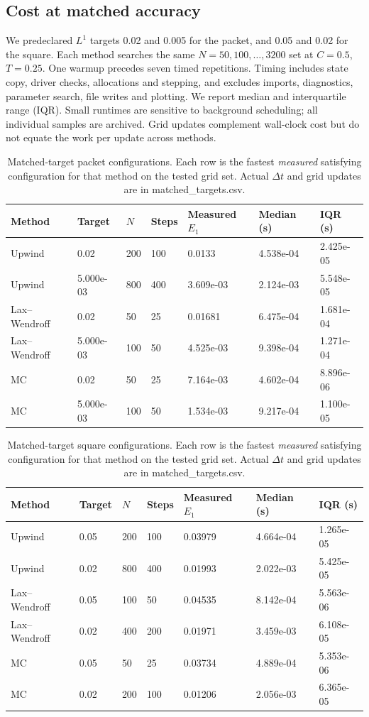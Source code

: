\subsection{Cost at matched accuracy}
We predeclared $L^1$ targets 0.02 and 0.005 for the packet, and 0.05 and 0.02 for the square. Each method searches the same $N=50,100,\ldots,3200$ set at $C=0.5$, $T=0.25$. One warmup precedes seven timed repetitions. Timing includes state copy, driver checks, allocations and stepping, and excludes imports, diagnostics, parameter search, file writes and plotting. We report median and interquartile range (IQR). Small runtimes are sensitive to background scheduling; all individual samples are archived. Grid updates complement wall-clock cost but do not equate the work per update across methods.
\begin{table}[htbp]\centering\small
\caption{Matched-target packet configurations. Each row is the fastest \emph{measured} satisfying configuration for that method on the tested grid set. Actual $\Delta t$ and grid updates are in matched\_targets.csv.}\label{tab:costpacket}
\begin{tabular}{lllllll}
\toprule
Method & Target & $N$ & Steps & Measured $E_1$ & Median (s) & IQR (s)\\\midrule
Upwind & 0.02 & 200 & 100 & 0.0133 & 4.538e-04 & 2.425e-05\\
Upwind & 5.000e-03 & 800 & 400 & 3.609e-03 & 2.124e-03 & 5.548e-05\\
Lax--Wendroff & 0.02 & 50 & 25 & 0.01681 & 6.475e-04 & 1.681e-04\\
Lax--Wendroff & 5.000e-03 & 100 & 50 & 4.525e-03 & 9.398e-04 & 1.271e-04\\
MC & 0.02 & 50 & 25 & 7.164e-03 & 4.602e-04 & 8.896e-06\\
MC & 5.000e-03 & 100 & 50 & 1.534e-03 & 9.217e-04 & 1.100e-05\\
\bottomrule\end{tabular}\end{table}
\begin{table}[htbp]\centering\small
\caption{Matched-target square configurations. Each row is the fastest \emph{measured} satisfying configuration for that method on the tested grid set. Actual $\Delta t$ and grid updates are in matched\_targets.csv.}\label{tab:costsquare}
\begin{tabular}{lllllll}
\toprule
Method & Target & $N$ & Steps & Measured $E_1$ & Median (s) & IQR (s)\\\midrule
Upwind & 0.05 & 200 & 100 & 0.03979 & 4.664e-04 & 1.265e-05\\
Upwind & 0.02 & 800 & 400 & 0.01993 & 2.022e-03 & 5.425e-05\\
Lax--Wendroff & 0.05 & 100 & 50 & 0.04535 & 8.142e-04 & 5.563e-06\\
Lax--Wendroff & 0.02 & 400 & 200 & 0.01971 & 3.459e-03 & 6.108e-05\\
MC & 0.05 & 50 & 25 & 0.03734 & 4.889e-04 & 5.353e-06\\
MC & 0.02 & 200 & 100 & 0.01206 & 2.056e-03 & 6.365e-05\\
\bottomrule\end{tabular}\end{table}
